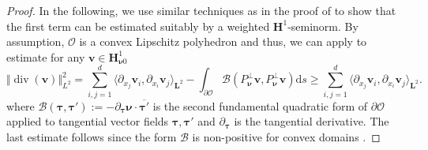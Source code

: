 \documentclass{m2an}
\newcommand{\dom}{\mathcal{O}} %
\newcommand{\nv}{\boldsymbol{\nu}}
\renewcommand{\v}{\mathbf{v}}
\renewcommand{\div}{\operatorname{div}}
\newcommand{\bH}{{\mathbf H}}
\newcommand{\bL}{\mathbf{L}}
\newcommand{\spl}{\langle}
\newcommand{\spr}{\rangle}
\theoremstyle{plain}
\theoremstyle{definition}
\begin{document}
\begin{proof}
   In the following, we use similar techniques as in the proof of \cite[Thm.~3.5]{HH21} to show that the first term can be estimated suitably by a weighted $\bH^1$-seminorm. By assumption, $\dom$ is a convex Lipschitz polyhedron and thus, we can apply \cite[Thm.~3.1.1.2]{G11} to estimate for any $\v \in \bH^1_{\nv 0}$
   \begin{equation}\label{eq:GrisvardEstimate}
      \Vert \div (\v) \Vert^2_{L^2} \! = \! \! \! \sum_{i,j = 1}^d \spl \partial_{x_j} \v_i, \partial_{x_i} \v_j \spr_{\bL^2} \! - \! \! \int_{\partial \dom} \! \! \! \! \mathcal{B}(P_{\nv}^\perp \v, P_{\nv}^\perp \v) \mathrm{d}s \ge \! \! \! \sum_{i,j = 1}^d \spl \partial_{x_j} \v_i, \partial_{x_i} \v_j \spr_{\bL^2}.
   \end{equation}
   where $\mathcal{B}(\bm{\tau},\bm{\tau}') := -\partial_{\bm{\tau}} \nv \cdot \overline{\bm{\tau}'}$ is the second fundamental quadratic form of $\partial \dom$ applied to tangential vector fields $\bm{\tau},\bm{\tau}'$ and $\partial_{\bm{\tau}}$ is the tangential derivative. The last estimate follows since the form $\mathcal{B}$ is non-positive for convex domains \cite[Sec.~3.1.1]{G11}.
   

\end{proof}
\end{document}
